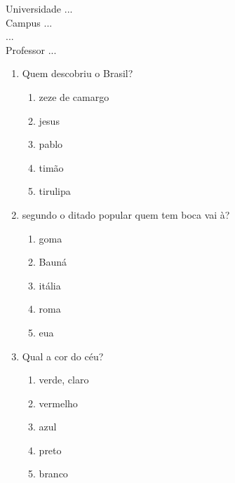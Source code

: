 \documentclass[10pt,a4paper,twocolumn]{report}
\begin{document}
\begin{flushleft}
Universidade ...\\
Campus ...\\
...\\
Professor ...\\
\end{flushleft}




 \begin{enumerate} 
    \item  Quem descobriu o Brasil?





    \begin{enumerate}
    \item  zeze de camargo

\item  jesus

\item  pablo

\item  timão

\item  tirulipa


    \end{enumerate} 
    \item  segundo o ditado popular quem tem boca vai à?





    \begin{enumerate}
    \item  goma

\item  Bauná

\item  itália

\item  roma

\item  eua


    \end{enumerate} 
    \item  Qual a cor do céu?





    \begin{enumerate}
    \item  verde, claro

\item  vermelho

\item  azul

\item  preto

\item  branco


    \end{enumerate}\end{enumerate} 
\end{document}
